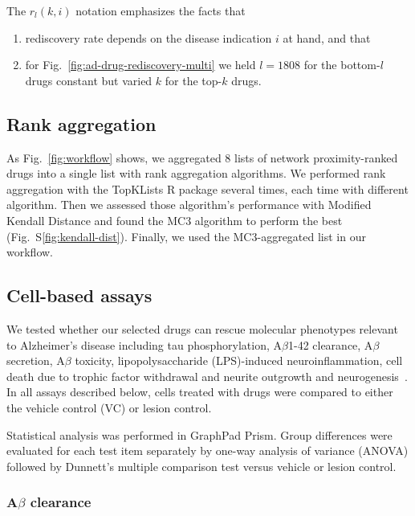 \documentclass[letterpaper]{article}
\begin{document}
The $r_l(k, i)$ notation emphasizes the facts that
\begin{enumerate}
  \item rediscovery rate depends on the disease indication $i$ at hand, and
    that
  \item for
    Fig.~\ref{fig:ad-drug-rediscovery-multi}
    we held $l=1808$ for the bottom-$l$ drugs constant but varied $k$ for the
    top-$k$ drugs.
\end{enumerate}


\subsection{Rank aggregation}

As Fig.~\ref{fig:workflow} shows, we aggregated 8 lists of network
proximity-ranked drugs into a single list with rank aggregation algorithms.
We performed rank aggregation with the TopKLists R package
several times, each time with different algorithm.  Then we assessed those
algorithm's performance with Modified Kendall Distance and found the MC3
algorithm to perform the best (Fig.~S\ref{fig:kendall-dist}).  Finally, we
used the MC3-aggregated list in our workflow.

\subsection{Cell-based assays}

We tested whether our selected drugs can rescue molecular phenotypes relevant
to Alzheimer's disease including tau phosphorylation, A$\beta$1-42 clearance,
A$\beta$ secretion, A$\beta$ toxicity, lipopolysaccharide (LPS)-induced
neuroinflammation, cell death due to trophic factor withdrawal and neurite
outgrowth and neurogenesis~\citep{Varma2020,Desai2022a}. In all assays
described below, cells treated with drugs were compared to either the vehicle
control (VC) or lesion control.

Statistical analysis was performed in GraphPad Prism. Group differences
were evaluated for each test item separately by one-way analysis of variance
(ANOVA) followed by Dunnett's multiple comparison test versus vehicle or
lesion control.

\subsubsection{A$\beta$ clearance}
\end{document}
